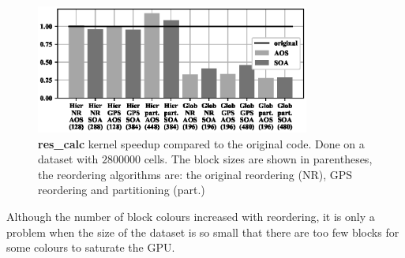 \begin{figure}[Htbp]
  \centering
  \includegraphics[width=9cm]{fig/airfoil_speedup_large.eps}
  \caption{\textbf{res\_calc} kernel speedup compared to the original code. Done
  on a dataset with $2800000$ cells. The block sizes are shown in parentheses,
  the reordering algorithms are: the original reordering (NR), GPS reordering
  and partitioning (part.)}
  \label{fig:airfoil_speedup_large}
\end{figure}

Although the number of block colours increased with reordering, it is only a
problem when the size of the dataset is so small that there are too few blocks for some colours to saturate the GPU.




